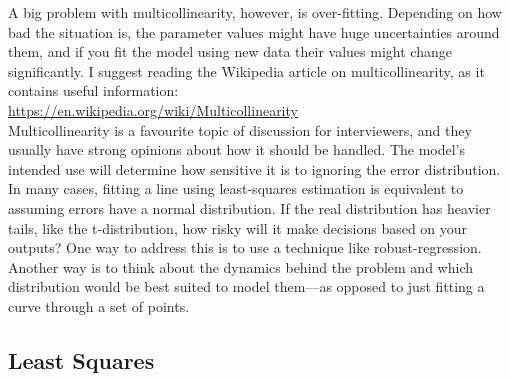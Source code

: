 \documentclass{article}
\theoremstyle{definition}
\theoremstyle{remark}
\theoremstyle{definition}
\begin{document}
\begin{enumerate}
  A big problem with multicollinearity, however, is over-fitting.
  Depending on how bad the situation is, the parameter values might have huge uncertainties around them, and if you fit the model using new data their values might change significantly.
  I suggest reading the Wikipedia article on multicollinearity, as it contains useful information: \\
  \url{https://en.wikipedia.org/wiki/Multicollinearity} \\
  Multicollinearity is a favourite topic of discussion for interviewers, and they usually have strong opinions about how it should be handled.
  The model's intended use will determine how sensitive it is to ignoring the error distribution.
  In many cases, fitting a line using least-squares estimation is equivalent to assuming errors have a normal distribution.
  If the real distribution has heavier tails, like the t-distribution, how risky will it make decisions based on your outputs?
  One way to address this is to use a technique like robust-regression.
  Another way is to think about the dynamics behind the problem and which distribution would be best suited to model them---as opposed to just fitting a curve through a set of points.
\end{enumerate}

\subsection{Least Squares}
\end{document}
